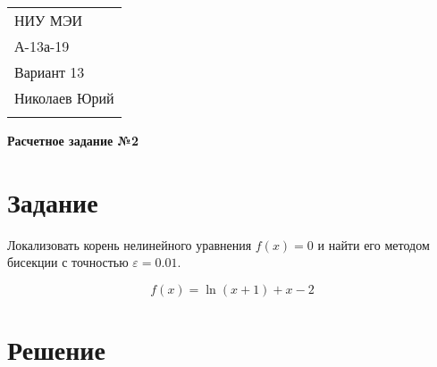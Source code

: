 \documentclass[a4paper,12pt]{article} %
\begin{document}



\thispagestyle{empty} %

\begin{tabular}{p{15.5cm}} %
НИУ МЭИ \\ А-13а-19  \\ Вариант 13 \\ Николаев Юрий\\
\hline %
\\
\end{tabular} %

\vspace*{0.3cm} %

\begin{center} %
	{\Large \bf Расчетное задание №2} %
	\vspace{2mm}
\end{center}  

\vspace{0.4cm}


\section{Задание}
Локализовать корень нелинейного уравнения $f(x) = 0$ и найти его методом бисекции с точностью $\varepsilon = 0.01$.

$$f(x) = \ln (x + 1) + x - 2$$

\section{Решение}
\end{document}

